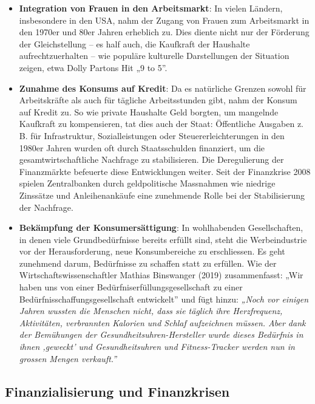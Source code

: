 \documentclass[
  nswissgerman,
  a4paper,
  openany]{book}
\begin{document}
\begin{itemize}
\item
  \textbf{Integration von Frauen in den Arbeitsmarkt}: In vielen
  Ländern, insbesondere in den USA, nahm der Zugang von Frauen zum
  Arbeitsmarkt in den 1970er und 80er Jahren erheblich zu. Dies diente
  nicht nur der Förderung der Gleichstellung -- es half auch, die
  Kaufkraft der Haushalte aufrechtzuerhalten -- wie populäre kulturelle
  Darstellungen der Situation zeigen, etwa Dolly Partons Hit „9 to 5''.
\item
  \textbf{Zunahme des Konsums auf Kredit}: Da es natürliche Grenzen
  sowohl für Arbeitskräfte als auch für tägliche Arbeitsstunden gibt,
  nahm der Konsum auf Kredit zu. So wie private Haushalte Geld borgten,
  um mangelnde Kaufkraft zu kompensieren, tat dies auch der Staat:
  Öffentliche Ausgaben z. B. für Infrastruktur, Sozialleistungen oder
  Steuererleichterungen in den 1980er Jahren wurden oft durch
  Staatsschulden finanziert, um die gesamtwirtschaftliche Nachfrage zu
  stabilisieren. Die Deregulierung der Finanzmärkte befeuerte diese
  Entwicklungen weiter. Seit der Finanzkrise 2008 spielen Zentralbanken
  durch geldpolitische Massnahmen wie niedrige Zinssätze und
  Anleihenankäufe eine zunehmende Rolle bei der Stabilisierung der
  Nachfrage.
\item
  \textbf{Bekämpfung der Konsumersättigung}: In wohlhabenden
  Gesellschaften, in denen viele Grundbedürfnisse bereits erfüllt sind,
  steht die Werbeindustrie vor der Herausforderung, neue Konsumbereiche
  zu erschliessen. Es geht zunehmend darum, Bedürfnisse zu schaffen
  statt zu erfüllen. Wie der Wirtschaftswissenschaftler Mathias
  Binswanger (2019) zusammenfasst: „Wir haben uns von einer
  Bedürfniserfüllungsgesellschaft zu einer
  Bedürfnisschaffungsgesellschaft entwickelt'' und fügt hinzu:
  \emph{„Noch vor einigen Jahren wussten die Menschen nicht, dass sie
  täglich ihre Herzfrequenz, Aktivitäten, verbrannten Kalorien und
  Schlaf aufzeichnen müssen. Aber dank der Bemühungen der
  Gesundheitsuhren-Hersteller wurde dieses Bedürfnis in ihnen ‚geweckt'
  und Gesundheitsuhren und Fitness-Tracker werden nun in grossen Mengen
  verkauft.''}
\end{itemize}

\subsection{Finanzialisierung und
Finanzkrisen}\label{finanzialisierung-und-finanzkrisen}
\end{document}
